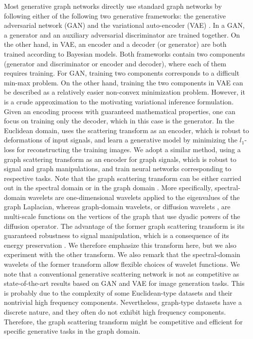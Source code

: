 \documentclass[conference]{IEEEtran}
\begin{document}
Most generative graph networks directly use standard graph networks by following either of the following two generative frameworks: the generative adversarial network (GAN) \cite{goodfellow2014generative} and the variational auto-encoder (VAE) \cite{kingma2013auto}. 
In a GAN, a generator and an auxiliary adversarial discriminator are trained together. On the other hand, in VAE, an encoder and a decoder (or generator) are both trained according to Bayesian models. Both frameworks contain two components (generator and discriminator or encoder and decoder), where each of them requires training. For GAN, training two components corresponds to a difficult min-max problem. On the other hand, training the two components in VAE can be described as a relatively easier non-convex minimization problem. However, it is a crude approximation to the motivating variational inference formulation.
Given an encoding process with guaranteed mathematical properties, one can focus on training only the decoder, which in this case is the generator.
In the Euclidean domain, \cite{angles2018generative} uses the scattering transform as an encoder, which is robust to deformations of input signals, and learn a generative model by minimizing the $l_1$-loss for reconstructing the training images. We adopt a similar method, using a graph scattering transform as an encoder for graph signals, which is robust to signal and graph manipulations, and train neural networks corresponding to respective tasks. Note that the graph scattering transform can be either carried out in the spectral domain \cite{zou2018graph} or in the graph domain \cite{gama2018diffusion}. More specifically, spectral-domain wavelets \cite{hammond2011wavelets} are one-dimensional wavelets applied to the eigenvalues of the graph Laplacian, whereas graph-domain   wavelets, or diffusion wavelets \cite{coifman2006diffusion}, are multi-scale functions on the vertices of the graph that use dyadic powers of the diffusion operator. The advantage of the former graph scattering transform is its guaranteed robustness to signal manipulation, which is a consequence of its energy preservation \cite{zou2018graph}. We therefore emphasize this transform here, but we also experiment with the other transform. We also remark that the spectral-domain wavelets of the former transform allow flexible choices of wavelet functions. 
We note that a conventional generative scattering network \cite{angles2018generative} is not as competitive as state-of-the-art results based on GAN and VAE for image generation tasks. This is probably due to the complexity of some Euclidean-type datasets and their nontrivial high frequency components. Nevertheless, graph-type datasets have a discrete nature, and they often do not exhibit high frequency components. Therefore, the graph scattering transform might be competitive and efficient for specific generative tasks in the graph domain.
\end{document}
